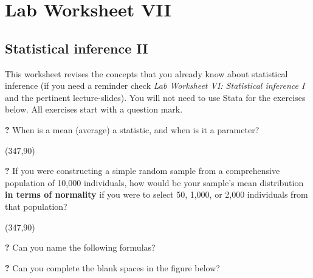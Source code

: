 \section{\hfil Lab Worksheet VII \hfil}
\subsection*{Statistical inference II}

This worksheet revises the concepts that you already know about statistical inference (if you need a reminder check \textit{Lab Worksheet VI: Statistical inference I} and the pertinent lecture-slides). You will not need to use Stata for the exercises below. All exercises start with a question mark. 

\forceindent \textbf{?} When is a mean (average) a statistic, and when is it a parameter?

\framebox(347,90){}

\forceindent \textbf{?} If you were constructing a simple random sample from a comprehensive population of 10,000 individuals, how would be your sample's mean distribution \textbf{in terms of normality} if you were to select 50, 1,000, or 2,000 individuals from that population?

\framebox(347,90){}

\forceindent \textbf{?} Can you name the following formulas?

\begin{center}
\end{center}

\begin{center}
\end{center}

\begin{center}
\end{center}

\forceindent \textbf{?} Can you complete the blank spaces in the figure below?

